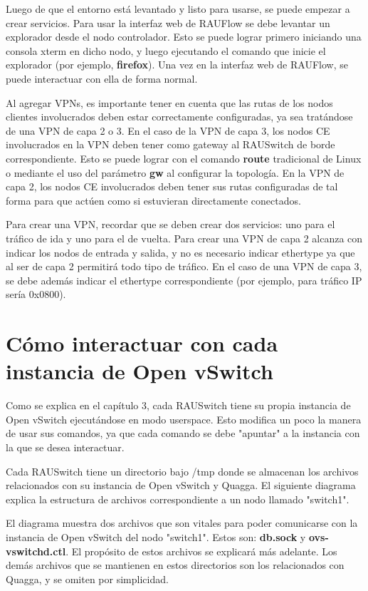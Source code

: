Luego de que el entorno está levantado y listo para usarse, se puede empezar a crear servicios. Para usar la interfaz web de RAUFlow se debe levantar un explorador desde el nodo controlador. Esto se puede lograr primero iniciando una consola xterm en dicho nodo, y luego ejecutando el comando que inicie el explorador (por ejemplo, \textbf{firefox}). Una vez en la interfaz web de RAUFlow, se puede interactuar con ella de forma normal.

Al agregar VPNs, es importante tener en cuenta que las rutas de los nodos clientes involucrados deben estar correctamente configuradas, ya sea tratándose de una VPN de capa 2 o 3. En el caso de la VPN de capa 3, los nodos CE involucrados en la VPN deben tener como gateway al RAUSwitch de borde correspondiente. Esto se puede lograr con el comando \textbf{route} tradicional de Linux o mediante el uso del parámetro \textbf{gw} al configurar la topología. En la VPN de capa 2, los nodos CE involucrados deben tener sus rutas configuradas de tal forma para que actúen como si estuvieran directamente conectados.

Para crear una VPN, recordar que se deben crear dos servicios: uno para el tráfico de ida y uno para el de vuelta. Para crear una VPN de capa 2 alcanza con indicar los nodos de entrada y salida, y no es necesario indicar ethertype ya que al ser de capa 2 permitirá todo tipo de tráfico. En el caso de una VPN de capa 3, se debe además indicar el ethertype correspondiente (por ejemplo, para tráfico IP sería 0x0800).

\section{Cómo interactuar con cada instancia de Open vSwitch}
Como se explica en el capítulo 3, cada RAUSwitch tiene su propia instancia de Open vSwitch ejecutándose en modo userspace. Esto modifica un poco la manera de usar sus comandos, ya que cada comando se debe "apuntar" a la instancia con la que se desea interactuar.

Cada RAUSwitch tiene un directorio bajo /tmp donde se almacenan los archivos relacionados con su instancia de Open vSwitch y Quagga. El siguiente diagrama explica la estructura de archivos correspondiente a un nodo llamado "switch1". 

El diagrama muestra dos archivos que son vitales para poder comunicarse con la instancia de Open vSwitch del nodo "switch1". Estos son: \textbf{db.sock} y \textbf{ovs-vswitchd.ctl}. El propósito de estos archivos se explicará más adelante. Los demás archivos que se mantienen en estos directorios son los relacionados con Quagga, y se omiten por simplicidad.

